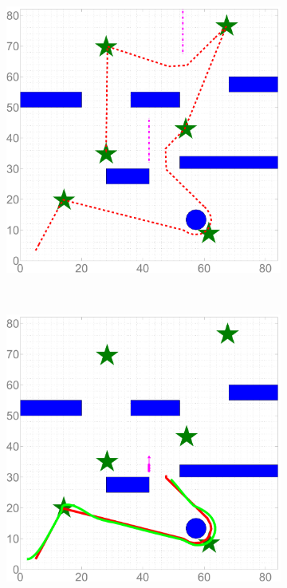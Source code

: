\documentclass[journal]{IEEEtran}
\begin{document}
	\begin{figure}
		\centering
		\begin{subfigure}{0.2\textwidth}
			\includegraphics[width=\textwidth]{figures/ref_traj_end}
			\caption{}
			\label{fig:ref_traj_h}
		\end{subfigure}
		~
		\begin{subfigure}{0.2\textwidth}
			\includegraphics[width=\textwidth]{figures/sim_traj_obs1}

\end{subfigure}
\end{figure}
\end{document}
